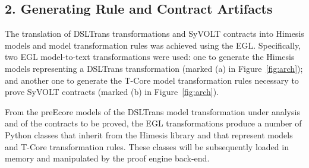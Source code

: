 \subsection*{2. Generating Rule and Contract Artifacts}
\label{sec:gen_models_mt}

The translation of DSLTrans transformations and SyVOLT contracts into Himesis
models and model transformation rules was achieved using the EGL. Specifically, two EGL model-to-text
transformations were used: one to generate the Himesis models
representing a DSLTrans transformation (marked (a) in Figure~\ref{fig:arch});
and another one to generate the T-Core model transformation rules necessary to prove
SyVOLT contracts (marked (b) in Figure~\ref{fig:arch}).

From the preEcore models of the DSLTrans model transformation under analysis and
of the contracts to be proved, the EGL transformations produce a number of Python
classes that inherit from the Himesis library and that represent models and
T-Core transformation rules. These classes will be subsequently loaded in memory
and manipulated by the proof engine back-end.


